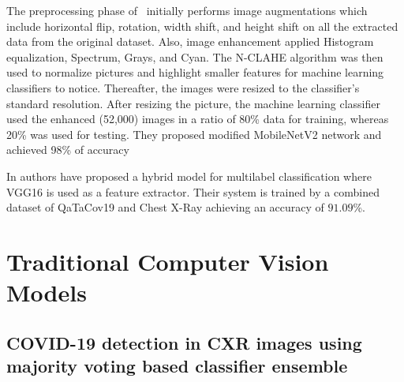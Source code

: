 The preprocessing phase of~\cite{akt} initially performs image augmentations which include horizontal flip, rotation, width shift, and height shift on all the extracted data from the original dataset. Also, image enhancement applied Histogram equalization, Spectrum, Grays, and Cyan. The N-CLAHE algorithm was then used to normalize pictures and highlight smaller features for machine learning classifiers to notice. Thereafter, the images were resized to the classifier’s standard resolution. After resizing the picture, the machine learning classifier used the enhanced (52,000) images in a ratio of 80\% data for training, whereas 20\% was used for testing. They proposed modified MobileNetV2 network and achieved 98\% of accuracy

In \cite{hyp} authors have proposed a hybrid model for multilabel classification where VGG16 is used as a feature extractor. Their system is trained by a combined dataset of QaTaCov19 and Chest X-Ray achieving an accuracy of $91.09$\%.
\section{Traditional Computer Vision Models}
\subsection{ COVID-19 detection in CXR images using
majority voting based classifier ensemble}

